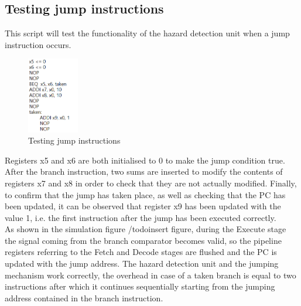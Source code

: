 \subsection{Testing jump instructions}
This script will test the functionality of the hazard detection unit when a jump instruction occurs.
\begin{figure}[H]
	\centering
	\includegraphics[width=0.2\textwidth]{sec3/images/test3.png}
	\caption{Testing jump instructions}
	\label{fig:test3}
\end{figure}
\noindent Registers x5 and x6 are both initialised to 0 to make the jump condition true. After the branch instruction, two sums are inserted to modify the contents of registers x7 and x8 in order to check that they are not actually modified. Finally, to confirm that the jump has taken place, as well as checking that the PC has been updated, it can be observed that register x9 has been updated with the value 1, i.e. the first instruction after the jump has been executed correctly.\\
As shown in the simulation figure /todo{insert figure}, during the Execute stage the signal coming from the branch comparator becomes valid, so the pipeline registers referring to the Fetch and Decode stages are flushed and the PC is updated with the jump address. The hazard detection unit and the jumping mechanism work correctly, the overhead in case of a taken branch is equal to two instructions after which it continues sequentially starting from the jumping address contained in the branch instruction.

